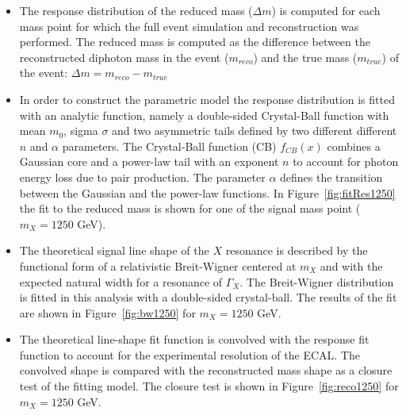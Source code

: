 \begin{itemize}
\item The response distribution of the reduced mass ($\Delta m$) is computed for each mass point for which the
  full event simulation and reconstruction was performed.
  The reduced mass is computed as the difference between
  the reconstructed diphoton mass in the event ($m_{reco}$)
  and the true mass ($m_{true}$) of the event: $\Delta m = m_{reco}-m_{true}$

\item In order to construct the parametric model the response distribution is fitted with an analytic function, namely a double-sided  Crystal-Ball function  with  mean $m_0$,  sigma $\sigma$ and two asymmetric tails defined by two different different $n$ and $\alpha$ parameters. The Crystal-Ball function (CB) $f_{CB}(x)$  combines a Gaussian core and a power-law tail with an exponent $n$ to account for photon energy loss due to pair production.
The parameter $\alpha$ defines the transition between the Gaussian and the power-law functions. 
In Figure~\ref{fig:fitRes1250} the fit to the reduced mass is shown for one of the signal mass point ($m_X = 1250$ GeV).

\item The theoretical signal line shape of the $X$ resonance is described by the functional form of a relativistic Breit-Wigner centered at $m_X$ and with the expected natural width for a resonance of $\Gamma_X$. The Breit-Wigner distribution is fitted in this analysis with a double-sided crystal-ball. The results of the fit are shown in Figure~\ref{fig:bw1250} for $m_X=1250$ GeV.

\item The theoretical line-shape fit function is convolved with the response fit function  to account for the experimental resolution of the ECAL. The convolved shape is compared with the reconstructed mass shape as a closure test of the fitting model. The closure test is shown in Figure~\ref{fig:reco1250} for $m_X=1250$ GeV.


\end{itemize}
